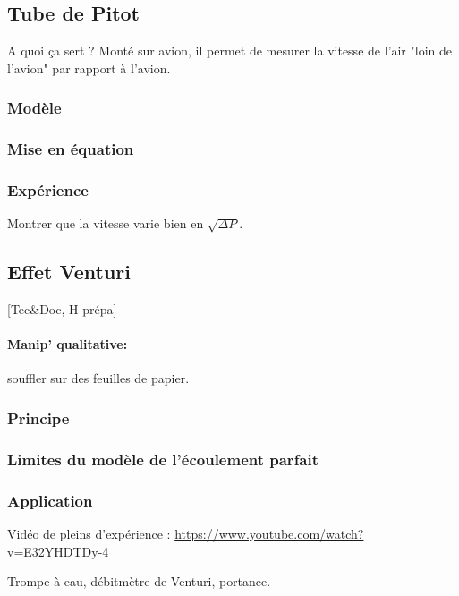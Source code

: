 \documentclass[11pt]{report}
\numberwithin{figure}{section}
\numberwithin{equation}{section}
\numberwithin{table}{section}
\newcommand{\1}{\boldsymbol{1}}
\begin{document}
\subsection{Tube de Pitot}

A quoi ça sert ? Monté sur avion, il permet de mesurer la vitesse de l'air "loin de l'avion" par rapport à l'avion.

\subsubsection{Modèle}

\subsubsection{Mise en équation}


\subsubsection{Expérience} Montrer que la vitesse varie bien en $\sqrt{\Delta P}$.

\subsection{Effet Venturi}

[Tec\&Doc, H-prépa]

\paragraph*{Manip' qualitative:} souffler sur des feuilles de papier.

\subsubsection{Principe}

\subsubsection{Limites du modèle de l'écoulement parfait}

\subsubsection{Application}

Vidéo de pleins d'expérience : \url{https://www.youtube.com/watch?v=E32YHDTDy-4}

Trompe à eau, débitmètre de Venturi, portance.
\end{document}
